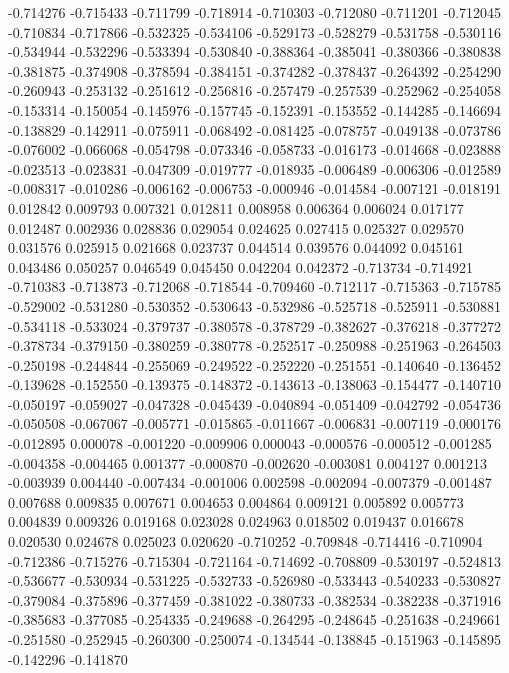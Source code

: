 -0.714276
-0.715433
-0.711799
-0.718914
-0.710303
-0.712080
-0.711201
-0.712045
-0.710834
-0.717866
-0.532325
-0.534106
-0.529173
-0.528279
-0.531758
-0.530116
-0.534944
-0.532296
-0.533394
-0.530840
-0.388364
-0.385041
-0.380366
-0.380838
-0.381875
-0.374908
-0.378594
-0.384151
-0.374282
-0.378437
-0.264392
-0.254290
-0.260943
-0.253132
-0.251612
-0.256816
-0.257479
-0.257539
-0.252962
-0.254058
-0.153314
-0.150054
-0.145976
-0.157745
-0.152391
-0.153552
-0.144285
-0.146694
-0.138829
-0.142911
-0.075911
-0.068492
-0.081425
-0.078757
-0.049138
-0.073786
-0.076002
-0.066068
-0.054798
-0.073346
-0.058733
-0.016173
-0.014668
-0.023888
-0.023513
-0.023831
-0.047309
-0.019777
-0.018935
-0.006489
-0.006306
-0.012589
-0.008317
-0.010286
-0.006162
-0.006753
-0.000946
-0.014584
-0.007121
-0.018191
0.012842
0.009793
0.007321
0.012811
0.008958
0.006364
0.006024
0.017177
0.012487
0.002936
0.028836
0.029054
0.024625
0.027415
0.025327
0.029570
0.031576
0.025915
0.021668
0.023737
0.044514
0.039576
0.044092
0.045161
0.043486
0.050257
0.046549
0.045450
0.042204
0.042372
-0.713734
-0.714921
-0.710383
-0.713873
-0.712068
-0.718544
-0.709460
-0.712117
-0.715363
-0.715785
-0.529002
-0.531280
-0.530352
-0.530643
-0.532986
-0.525718
-0.525911
-0.530881
-0.534118
-0.533024
-0.379737
-0.380578
-0.378729
-0.382627
-0.376218
-0.377272
-0.378734
-0.379150
-0.380259
-0.380778
-0.252517
-0.250988
-0.251963
-0.264503
-0.250198
-0.244844
-0.255069
-0.249522
-0.252220
-0.251551
-0.140640
-0.136452
-0.139628
-0.152550
-0.139375
-0.148372
-0.143613
-0.138063
-0.154477
-0.140710
-0.050197
-0.059027
-0.047328
-0.045439
-0.040894
-0.051409
-0.042792
-0.054736
-0.050508
-0.067067
-0.005771
-0.015865
-0.011667
-0.006831
-0.007119
-0.000176
-0.012895
0.000078
-0.001220
-0.009906
0.000043
-0.000576
-0.000512
-0.001285
-0.004358
-0.004465
0.001377
-0.000870
-0.002620
-0.003081
0.004127
0.001213
-0.003939
0.004440
-0.007434
-0.001006
0.002598
-0.002094
-0.007379
-0.001487
0.007688
0.009835
0.007671
0.004653
0.004864
0.009121
0.005892
0.005773
0.004839
0.009326
0.019168
0.023028
0.024963
0.018502
0.019437
0.016678
0.020530
0.024678
0.025023
0.020620
-0.710252
-0.709848
-0.714416
-0.710904
-0.712386
-0.715276
-0.715304
-0.721164
-0.714692
-0.708809
-0.530197
-0.524813
-0.536677
-0.530934
-0.531225
-0.532733
-0.526980
-0.533443
-0.540233
-0.530827
-0.379084
-0.375896
-0.377459
-0.381022
-0.380733
-0.382534
-0.382238
-0.371916
-0.385683
-0.377085
-0.254335
-0.249688
-0.264295
-0.248645
-0.251638
-0.249661
-0.251580
-0.252945
-0.260300
-0.250074
-0.134544
-0.138845
-0.151963
-0.145895
-0.142296
-0.141870
